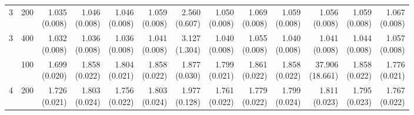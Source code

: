 \begin{table}[p]
{\begin{tabular}{llrrrrrrrrrrr}
3 & 200 & \shortstack{1.035\\(0.008)} & \shortstack{1.046\\(0.008)} & \shortstack{1.046\\(0.008)} & \shortstack{1.059\\(0.008)} & \shortstack{2.560\\(0.607)} & \shortstack{1.050\\(0.008)} & \shortstack{1.069\\(0.008)} & \shortstack{1.059\\(0.008)} & \shortstack{1.056\\(0.008)} & \shortstack{1.059\\(0.008)} & \shortstack{1.067\\(0.008)} \\
3 & 400 & \shortstack{1.032\\(0.008)} & \shortstack{1.036\\(0.008)} & \shortstack{1.036\\(0.008)} & \shortstack{1.041\\(0.008)} & \shortstack{3.127\\(1.304)} & \shortstack{1.040\\(0.008)} & \shortstack{1.055\\(0.008)} & \shortstack{1.040\\(0.008)} & \shortstack{1.041\\(0.008)} & \shortstack{1.044\\(0.008)} & \shortstack{1.057\\(0.008)} \\
\addlinespace
4 & 100 & \shortstack{1.699\\(0.020)} & \shortstack{1.858\\(0.022)} & \shortstack{1.804\\(0.021)} & \shortstack{1.858\\(0.022)} & \shortstack{1.877\\(0.030)} & \shortstack{1.799\\(0.021)} & \shortstack{1.861\\(0.022)} & \shortstack{1.858\\(0.022)} & \shortstack{37.906\\(18.661)} & \shortstack{1.858\\(0.022)} & \shortstack{1.776\\(0.021)} \\
4 & 200 & \shortstack{1.726\\(0.021)} & \shortstack{1.803\\(0.024)} & \shortstack{1.756\\(0.022)} & \shortstack{1.803\\(0.024)} & \shortstack{1.977\\(0.128)} & \shortstack{1.761\\(0.022)} & \shortstack{1.779\\(0.022)} & \shortstack{1.799\\(0.024)} & \shortstack{1.811\\(0.023)} & \shortstack{1.795\\(0.023)} & \shortstack{1.767\\(0.022)} \\

\end{tabular}}
\end{table}
